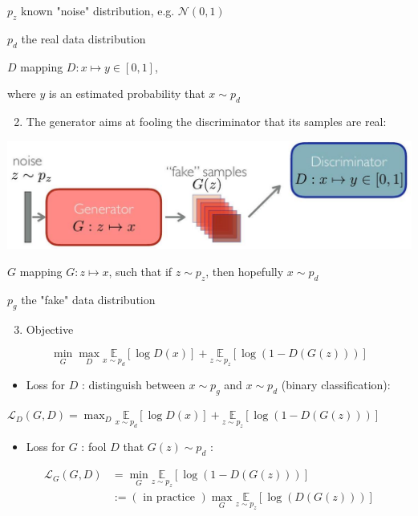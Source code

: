 \documentclass[10pt]{article}
\begin{document}
$p_{z}$ known "noise" distribution, e.g. $\mathcal{N}(0,1)$

$p_{d}$ the real data distribution

$D$ mapping $D: x \mapsto y \in[0,1]$,

where $y$ is an estimated probability that $x \sim p_{d}$

\begin{enumerate}
  \setcounter{enumi}{1}
  \item The generator aims at fooling the discriminator that its samples are real:
\end{enumerate}

\begin{center}
\includegraphics[max width=\textwidth]{2024_01_08_a381fc3992661ee7020eg-05}
\end{center}

$G$ mapping $G: z \mapsto x$, such that if $z \sim p_{z}$, then hopefully $x \sim p_{d}$

$p_{g}$ the "fake" data distribution

\begin{enumerate}
  \setcounter{enumi}{2}
  \item Objective
\end{enumerate}

$$
\min _{G} \max _{D} \underset{x \sim p_{d}}{\mathbb{E}}[\log D(x)]+\underset{z \sim p_{z}}{\mathbb{E}}[\log (1-D(G(z)))]
$$

\begin{itemize}
  \item Loss for $D$ : distinguish between $x \sim p_{g}$ and $x \sim p_{d}$ (binary classification):
\end{itemize}

$\mathscr{L}_{D}(G, D)=\max _{D} \underset{x \sim p_{d}}{\mathbb{E}}[\log D(x)]+\underset{z \sim p_{z}}{\mathbb{E}}[\log (1-D(G(z)))]$

\begin{itemize}
  \item Loss for $G$ : fool $D$ that $G(z) \sim p_{d}$ :
\end{itemize}

$$
\begin{aligned}
\mathscr{L}_{G}(G, D) & =\min _{G} \underset{z \sim p_{z}}{\mathbb{E}}[\log (1-D(G(z)))] \\
& :=(\text { in practice }) \max _{G} \underset{z \sim p_{z}}{\mathbb{E}}[\log (D(G(z)))]
\end{aligned}
$$
\end{document}
